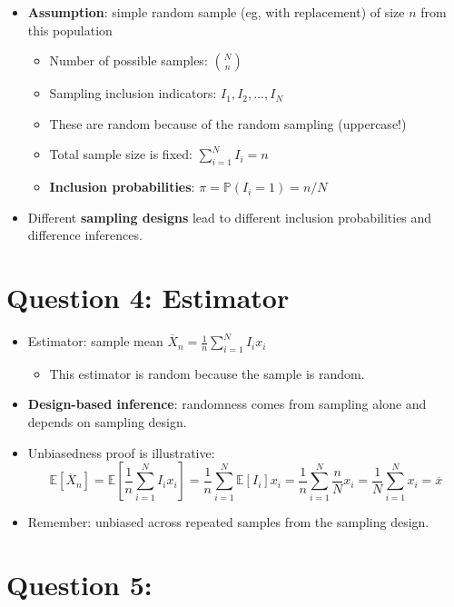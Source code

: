 \documentclass[
  letterpaper,
  DIV=11,
  numbers=noendperiod]{scrreprt}
\providecommand{\tightlist}{%
  \setlength{\itemsep}{0pt}\setlength{\parskip}{0pt}}\usepackage{longtable,booktabs,array}
\newcommand{\E}{\mathbb{E}}
\renewcommand{\P}{\mathbb{P}}
\newcommand{\Xbar}{\overline{X}}
\theoremstyle{definition}
\theoremstyle{plain}
\theoremstyle{definition}
\theoremstyle{remark}
\begin{document}
\begin{itemize}
\item
  \textbf{Assumption}: simple random sample (eg, with replacement) of
  size \(n\) from this population

  \begin{itemize}
  \tightlist
  \item
    Number of possible samples: \(N \choose n\)
  \item
    Sampling inclusion indicators: \(I_1, I_2, \ldots, I_N\)
  \item
    These are random because of the random sampling (uppercase!)
  \item
    Total sample size is fixed: \(\sum_{i=1}^{N} I_{i} = n\)
  \item
    \textbf{Inclusion probabilities}: \(\pi = \P(I_{i} = 1) = n/N\)
  \end{itemize}
\item
  Different \textbf{sampling designs} lead to different inclusion
  probabilities and difference inferences.
\end{itemize}

\hypertarget{question-4-estimator}{%
\section{Question 4: Estimator}\label{question-4-estimator}}

\begin{itemize}
\item
  Estimator: sample mean
  \(\overline{X}_n = \frac{1}{n} \sum_{i=1}^{N}I_ix_i\)

  \begin{itemize}
  \tightlist
  \item
    This estimator is random because the sample is random.
  \end{itemize}
\item
  \textbf{Design-based inference}: randomness comes from sampling alone
  and depends on sampling design.
\item
  Unbiasedness proof is illustrative: \[ 
  \E[\Xbar_{n}] = \E\left[\frac{1}{n} \sum_{i=1}^{N} I_{i}x_{i}\right] = \frac{1}{n} \sum_{i=1}^{N} \E[I_{i}]x_{i} = \frac{1}{n} \sum_{i=1}^{N} \frac{n}{N}x_{i} = \frac{1}{N} \sum_{i=1}^{N}x_{i} = \overline{x} 
  \]
\item
  Remember: unbiased across repeated samples from the sampling design.
\end{itemize}

\hypertarget{question-5}{%
\section{Question 5:}\label{question-5}}
\end{document}
